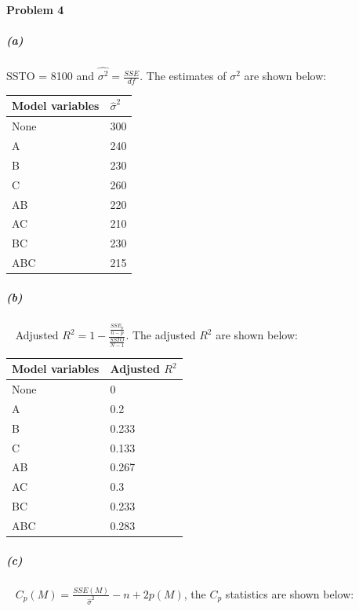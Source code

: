 \documentclass[12pt,a4paper]{article}
\begin{document}
\paragraph{Problem 4}
\subparagraph{(a)}
SSTO = 8100 and $\hat{\sigma^2} = \frac{SSE}{df}$. The estimates of $\sigma^2$ are shown below:\\
\begin{center}
\begin{tabular}{|l|l|}
\hline
Model variables & $\hat{\sigma}^2$ \\ \hline
None            & 300      \\ \hline
A               & 240        \\ \hline
B               & 230        \\ \hline
C               & 260        \\ \hline
AB              & 220      \\ \hline
AC              & 210      \\ \hline
BC              & 230      \\ \hline
ABC             & 215      \\ \hline
\end{tabular}
\end{center}
\subparagraph{(b)}~{}
Adjusted $R^2 = 1 - \frac{\frac{SSE_p}{n - p}}{\frac{SSTO}{N - 1}}$. The adjusted $R^2$ are shown below:\\
\begin{center}
\begin{tabular}{|l|l|}
\hline
Model variables &  Adjusted $R^2$ \\ \hline
None            & 0      \\ \hline
A               & 0.2        \\ \hline
B               & 0.233        \\ \hline
C               & 0.133      \\ \hline
AB              & 0.267      \\ \hline
AC              & 0.3      \\ \hline
BC              & 0.233      \\ \hline
ABC             & 0.283      \\ \hline
\end{tabular}
\end{center}
\subparagraph{(c)}~{}
$C_p(M) = \frac{SSE(M)}{\hat{\sigma}^2} - n + 2p(M)$, the $C_p$ statistics are shown below:\\
\end{document}
